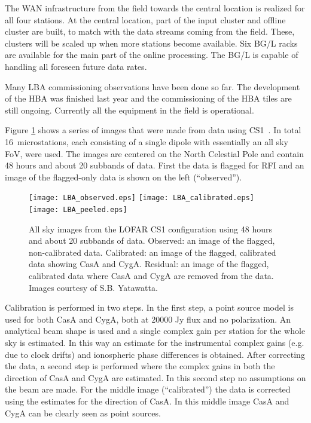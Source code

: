 \documentclass[journal]{IEEEtran}
\begin{document}

The WAN infrastructure from the field towards the central location is realized for all four stations. At the central location, part of the input cluster and offline cluster are built, to match with the data streams coming from the field. These, clusters will be scaled up when more stations become available. Six BG/L racks are available for the main part of the online processing. The BG/L is capable of handling all foreseen future data rates.

Many LBA commissioning observations have been done so far. The development of the HBA was finished last year and the commissioning of the HBA tiles are still ongoing. Currently all the equipment in the field is operational.

Figure \ref{fig:skymap} shows a series of images that were made from data using CS1~\cite{Yatawatta:08}. In total 16~microstations, each consisting of a single dipole with essentially an all sky FoV, were used. The images are centered on the North Celestial Pole and contain 48 hours and about 20 subbands of data. First the data is flagged for RFI and an image of the flagged-only data is shown on the left (``observed''). 

\begin{figure}
\centering
\texttt{[image: LBA\_observed.eps]}
\texttt{[image: LBA\_calibrated.eps]}
\texttt{[image: LBA\_peeled.eps]}
\caption{All sky images from the LOFAR CS1 configuration using 48 hours and about 20 subbands of data. Observed: an image of the flagged, non-calibrated data. Calibrated: an image of the flagged, calibrated data showing CasA and CygA. Residual: an image of the flagged, calibrated data where CasA and CygA are removed from the data. Images courtesy of S.B. Yatawatta.}
\label{fig:skymap}
\end{figure}

Calibration is performed in two steps. In the first step, a point source model is used for both CasA and CygA, both at 20000 Jy flux and no polarization. An analytical beam shape is used and a single complex gain per station for the whole sky is estimated. In this way an estimate for the instrumental complex gains (e.g. due to clock drifts) and ionospheric phase differences is obtained. After correcting the data, a second step is performed where the complex gains in both the direction of CasA and CygA are estimated. In this second step no assumptions on the beam are made. For the middle image (``calibrated'') the data is corrected using the estimates for the direction of CasA. In this middle image CasA and CygA can be clearly seen as point sources. 
\end{document}
